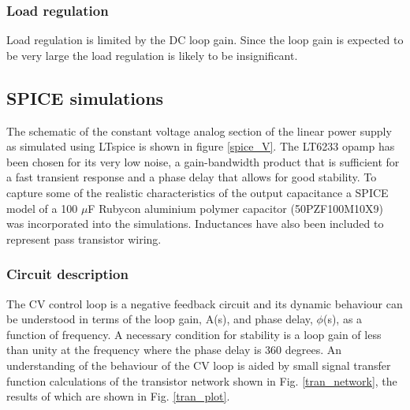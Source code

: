 \documentclass[a4paper,10pt, oneside]{article}
\begin{document}
\subsubsection*{Load regulation}
Load regulation is limited by the DC loop gain. Since the loop gain is expected to be very large the load regulation is likely to be insignificant. 
\subsection*{SPICE simulations}
The schematic of the constant voltage analog section of the linear power supply as simulated using LTspice is shown in figure \ref{spice_V}. The LT6233 opamp has been chosen for its very low noise, a gain-bandwidth product that is sufficient for a fast transient response and a phase delay that allows for good stability. To capture some of the realistic characteristics of the output capacitance a SPICE model of a 100 $\mu$F Rubycon aluminium polymer capacitor (50PZF100M10X9) was incorporated into the simulations. Inductances have also been included to represent pass transistor wiring. 
\subsubsection*{Circuit description}
The CV control loop is a negative feedback circuit and its dynamic behaviour can be understood in terms of the loop gain, A(s), and phase delay, $\phi$(s), as a function of frequency. A necessary condition for stability is a loop gain of less than unity at the frequency where the phase delay is 360 degrees. An understanding of the behaviour of the CV loop is aided by small signal transfer function calculations of the transistor network shown in Fig. \ref{tran_network}, the results of which are shown in Fig. \ref{tran_plot}.
\end{document}
